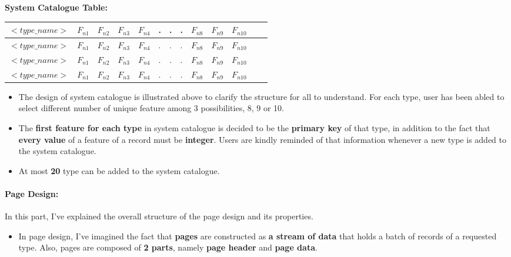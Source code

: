 \documentclass[12pt]{report}
\begin{document}
\hspace{4cm}\textbf{System Catalogue Table:} 
{
\begin{center}
\begin{tabular}{|l|l|l|l|l|l|l|l|l|l|l|l|l|}
\hline
 $<type\_name>$ & $F_{n1}$ & $F_{n2}$ & $F_{n3}$ & $F_{n4}$ & . & . & . & $F_{n8}$ & $F_{n9}$ & $F_{n{10}}$ \\
\hline
 $<type\_name>$ & $F_{n1}$ & $F_{n2}$ & $F_{n3}$ & $F_{n4}$ & . & . & . & $F_{n8}$ & $F_{n9}$ & $F_{n{10}}$ \\
\hline
 $<type\_name>$ & $F_{n1}$ & $F_{n2}$ & $F_{n3}$ & $F_{n4}$ & . & . & . & $F_{n8}$ & $F_{n9}$ & $F_{n{10}}$ \\
\hline
 $<type\_name>$ & $F_{n1}$ & $F_{n2}$ & $F_{n3}$ & $F_{n4}$ & . & . & . & $F_{n8}$ & $F_{n9}$ & $F_{n{10}}$ \\
\hline
\end{tabular}
\end{center}
}

\vspace{0.15cm}

\begin{itemize}
\item The design of system catalogue is illustrated above to clarify the structure for all to understand. For each type, user has been abled to select different number of unique feature among 3 possibilities, 8, 9 or 10.
\item The \textbf{first feature for each type} in system catalogue is decided to be the \textbf{primary  key} of that type, in addition to the fact that \textbf{every value} of a feature of a record must be \textbf{integer}. Users are kindly reminded of that information whenever a new type is added to the system catalogue.
\item At most \textbf{20} type can be added to the system catalogue.
\end{itemize}

\newpage
\paragraph{Page Design:}
In this part, I've explained the overall structure of the page design and its properties. \\

\begin{itemize}
\item In page design, I've imagined the fact that \textbf{pages} are constructed as \textbf{a stream of data} that holds a batch of records of a requested type. Also, pages are composed of \textbf{2 parts}, namely \textbf{page header} and \textbf{page data}.
\end{itemize}
\end{document}
